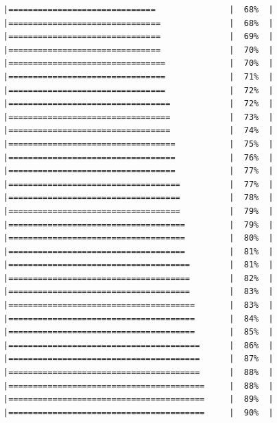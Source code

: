 \documentclass[
  krantz2]{krantz}
\begin{document}
\begin{verbatim}
|==============================               |  68%  |                                                     |===============================              |  68%  |                                                     |===============================              |  69%  |                                                     |===============================              |  70%  |                                                     |================================             |  70%  |                                                     |================================             |  71%  |                                                     |================================             |  72%  |                                                     |=================================            |  72%  |                                                     |=================================            |  73%  |                                                     |=================================            |  74%  |                                                     |==================================           |  75%  |                                                     |==================================           |  76%  |                                                     |==================================           |  77%  |                                                     |===================================          |  77%  |                                                     |===================================          |  78%  |                                                     |===================================          |  79%  |                                                     |====================================         |  79%  |                                                     |====================================         |  80%  |                                                     |====================================         |  81%  |                                                     |=====================================        |  81%  |                                                     |=====================================        |  82%  |                                                     |=====================================        |  83%  |                                                     |======================================       |  83%  |                                                     |======================================       |  84%  |                                                     |======================================       |  85%  |                                                     |=======================================      |  86%  |                                                     |=======================================      |  87%  |                                                     |=======================================      |  88%  |                                                     |========================================     |  88%  |                                                     |========================================     |  89%  |                                                     |========================================     |  90%  |                        
\end{verbatim}
\end{document}
